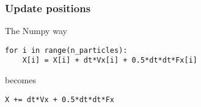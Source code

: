 \documentclass{beamer}
\begin{document}
\begin{frame}[fragile]

    \frametitle{Update positions}

    The Numpy way

    \bigskip

\begin{lstlisting}
for i in range(n_particles):
    X[i] = X[i] + dt*Vx[i] + 0.5*dt*dt*Fx[i]
\end{lstlisting}

becomes

\begin{lstlisting}
X += dt*Vx + 0.5*dt*dt*Fx
\end{lstlisting}

\end{frame}






\end{document}
